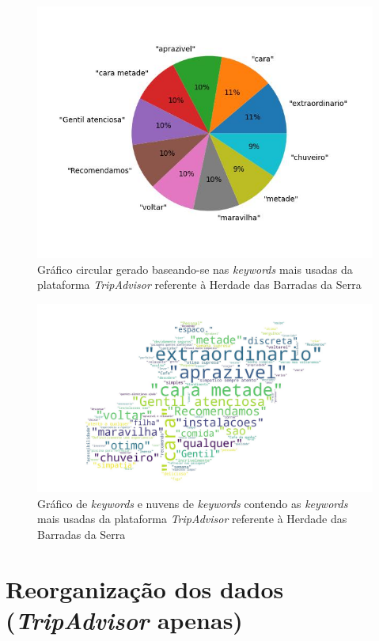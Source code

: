 \begin{figure}[!htb]
\centering
\includegraphics[width=14cm]{figuras/TripAdvisor/Hotels/hotel21_keywords.jpeg}
\caption{Gráfico circular gerado baseando-se nas \textit{keywords} mais usadas da plataforma \textit{TripAdvisor} referente à Herdade das Barradas da Serra}
\label{fig:exemplofig21keywordsTrip}
\end{figure}

\begin{figure}[!htb]
\centering
\includegraphics[width=14cm]{figuras/TripAdvisor/Hotels/hotel21_keywordcloud.jpeg}
\caption{Gráfico de \textit{keywords} e nuvens de \textit{keywords} contendo as \textit{keywords} mais usadas da plataforma \textit{TripAdvisor} referente à Herdade das Barradas da Serra}
\label{fig:exemplofig21cloudTrip}
\end{figure}

\clearpage
\section{Reorganização dos dados (\textit{TripAdvisor} apenas)}

